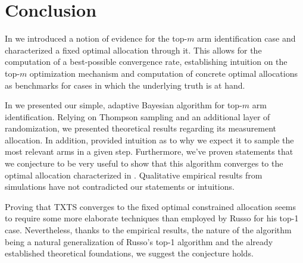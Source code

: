 \chapter{Conclusion}\label{chapter:conclusion}

In  we introduced a notion of evidence for the top-$m$ arm
identification case and characterized a fixed optimal allocation through it.
This allows for the computation of a best-possible convergence rate,
establishing intuition on the top-$m$ optimization mechanism and computation of
concrete optimal allocations as benchmarks for cases in which the underlying
truth is at hand.

In  we presented our simple, adaptive Bayesian algorithm
for top-$m$ arm identification. Relying on Thompson sampling and an additional
layer of randomization, we presented theoretical results regarding its
measurement allocation. In addition, provided intuition as to why we expect it
to sample the most relevant arms in a given step. Furthermore, we've proven
statements that we conjecture to be very useful to show that this algorithm
converges to the optimal allocation characterized in .
Qualitative empirical results from simulations have not contradicted our
statements or intuitions.

Proving that TXTS converges to the fixed optimal constrained allocation seems to
require some more elaborate techniques than employed by Russo for his top-1
case. Nevertheless, thanks to the empirical results, the nature of the algorithm
being a natural generalization of Russo's top-1 algorithm and the already
established theoretical foundations, we suggest the conjecture holds.
